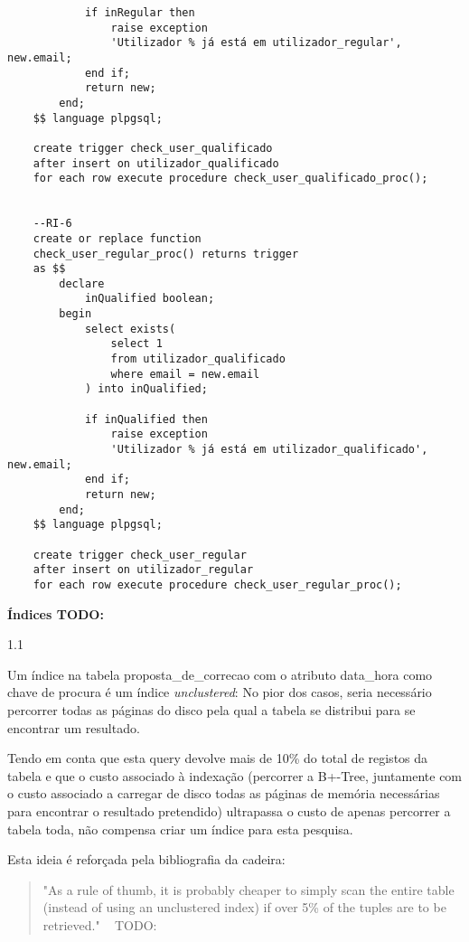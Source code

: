 \documentclass[12pt]{report}
\begin{document}
\begin{verbatim}
            if inRegular then
                raise exception
                'Utilizador % já está em utilizador_regular', new.email;
            end if;
            return new;
        end;
    $$ language plpgsql;
    
    create trigger check_user_qualificado
    after insert on utilizador_qualificado
    for each row execute procedure check_user_qualificado_proc();
    
    
    --RI-6
    create or replace function
    check_user_regular_proc() returns trigger
    as $$
        declare
            inQualified boolean;
        begin
            select exists(
                select 1
                from utilizador_qualificado
                where email = new.email
            ) into inQualified;
            
            if inQualified then
                raise exception
                'Utilizador % já está em utilizador_qualificado', new.email;
            end if;
            return new;
        end;
    $$ language plpgsql;
    
    create trigger check_user_regular
    after insert on utilizador_regular
    for each row execute procedure check_user_regular_proc();
    \end{verbatim}
    \normalsize
    
    \Large
    \textbf{Índices TODO:}%
    \normalsize \\
    \par 1.1
    \par Um índice na tabela proposta\_de\_correcao com o atributo data\_hora como chave de procura é um índice \textit{unclustered}: No pior dos casos, seria necessário percorrer todas as páginas do disco pela qual a tabela se distribui para se encontrar um resultado.

    \par Tendo em conta que esta query devolve mais de 10\% do total de registos da tabela e que o custo associado à indexação (percorrer a B+-Tree, juntamente com o custo associado a carregar de disco todas as páginas de memória necessárias para encontrar o resultado pretendido) ultrapassa o custo de apenas percorrer a tabela toda, não compensa criar um índice para esta pesquisa.

    \par Esta ideia é reforçada pela bibliografia da cadeira:
    \begin{quotation}
        "As a rule of thumb, it is probably cheaper to simply scan the entire table (instead of using an unclustered index) if over 5\% of the tuples are to be retrieved." ~ TODO:%
    \end{quotation}
    
\end{document}
